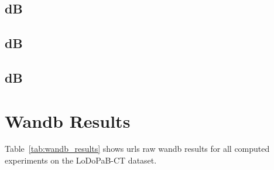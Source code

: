 \clearpage

\subsection{ dB}

\clearpage

\subsection{ dB}

\clearpage
\subsection{ dB}


\section{Wandb Results}
Table~\ref{tab:wandb_results} shows urls raw wandb results for all computed experiments on the LoDoPaB-CT dataset.
